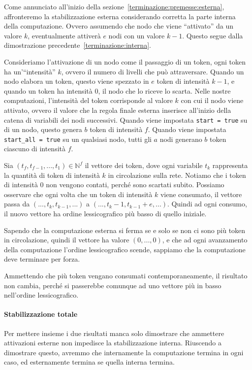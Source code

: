 \documentclass[12pt, a4paper]{article}
\begin{document}
Come annunciato all'inizio della sezione~\ref{terminazione:premesse:esterna}, affronteremo la stabilizzazione esterna considerando corretta la parte interna della computazione. Ovvero assumendo che nodo che viene ``attivato'' da un valore $k$, eventualmente attiverà $e$ nodi con un valore $k-1$. Questo segue dalla dimostrazione precedente~\ref{terminazione:interna}.

Consideriamo l'attivazione di un nodo come il passaggio di un token, ogni token ha un'``intensità'' $k$, ovvero il numero di livelli che può attraversare. Quando un nodo elabora un token, questo viene spezzato in $e$ token di intensità $k-1$, e quando un token ha intensità $0$, il nodo che lo riceve lo scarta.
Nelle nostre computazioni, l'intensità del token corrisponde al valore $k$ con cui il nodo viene attivato, ovvero il valore che la regola finale esterna inserisce all'inizio della catena di variabili dei nodi successivi. Quando viene impostata \lstinline{start = true} su di un nodo, questo genera $b$ token di intensità $f$. Quando viene impostata \lstinline{start_all = true} su un qualsiasi nodo, tutti gli $a$ nodi generano $b$ token ciascuno di intensità $f$.

Sia $(t_f,t_{f-1},...,t_1)\in\mathbb{N}^f$ il vettore dei token, dove ogni variabile $t_k$ rappresenta la quantità di token di intensità $k$ in circolazione sulla rete. Notiamo che i token di intensità $0$ non vengono contati, perché sono scartati subito.
Possiamo osservare che ogni volta che un token di intensità $k$ viene consumato, il vettore passa da $(...,t_k,t_{k-1},...)$ a $(...,t_k-1,t_{k-1}+e,...)$. Quindi ad ogni consumo, il nuovo vettore ha ordine lessicografico più basso di quello iniziale.

Sapendo che la computazione esterna si ferma se e solo se non ci sono più token in circolazione, quindi il vettore ha valore $(0,...,0)$, e che ad ogni avanzamento della computazione l'ordine lessicografico scende, sappiamo che la computazione deve terminare per forza.

Ammettendo che più token vengano consumati contemporaneamente, il risultato non cambia, perché si passerebbe comunque ad uno vettore più in basso nell'ordine lessicografico.

\paragraph{Stabilizzazione totale}\label{terminazione:totale}

Per mettere insieme i due risultati manca solo dimostrare che ammettere attivazioni esterne non impedisce la stabilizzazione interna. Riuscendo a dimostrare questo, avremmo che internamente la computazione termina in ogni caso, ed esternamente termina se quella interna termina.
\end{document}
